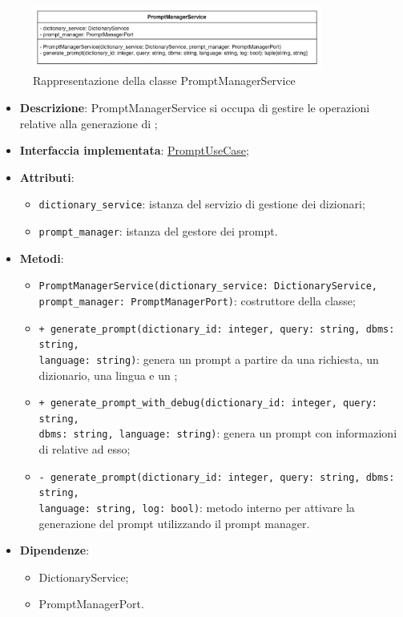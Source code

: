  \label{PromptManagementService}
\begin{figure}[H]
    \centering
    \includegraphics[width=0.85\textwidth]{assets/Backend/prompt_manager_service.png}
    \caption{Rappresentazione della classe PromptManagerService}
  \end{figure}
\begin{itemize}
    \item \textbf{Descrizione}: PromptManagerService si occupa di gestire le operazioni relative alla generazione di ;
    \item \textbf{Interfaccia implementata}: \hyperref[PromptUseCase]{PromptUseCase};
    \item \textbf{Attributi}:
    \begin{itemize}
        \item \texttt{dictionary\_service}: istanza del servizio di gestione dei dizionari;
        \item \texttt{prompt\_manager}: istanza del gestore dei prompt.
    \end{itemize}
    \item \textbf{Metodi}:
    \begin{itemize}
        \item \texttt{PromptManagerService(dictionary\_service: DictionaryService, prompt\_manager: PromptManagerPort)}: costruttore della classe;
        \item \texttt{+ generate\_prompt(dictionary\_id: integer, query: string, dbms: string,\\ language: string)}: genera un prompt a partire da una richiesta, un dizionario, una lingua e un ;
        \item \texttt{+ generate\_prompt\_with\_debug(dictionary\_id: integer, query: string, \\ dbms: string, language: string)}: genera un prompt con informazioni di  relative ad esso;
        \item \texttt{- generate\_prompt(dictionary\_id: integer, query: string, dbms: string,\\ language: string, log: bool)}: metodo interno per attivare la generazione del prompt utilizzando il prompt manager.
    \end{itemize}
    \item \textbf{Dipendenze}:
    \begin{itemize}
        \item DictionaryService;
        \item PromptManagerPort.
    \end{itemize}
\end{itemize}  